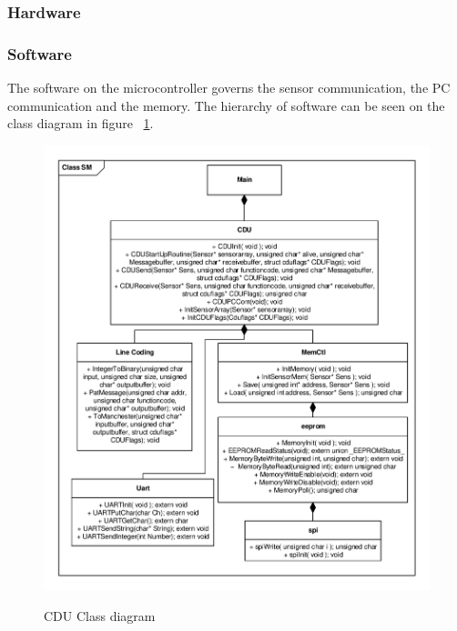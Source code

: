 \subsubsection{Hardware}

\subsubsection{Software}
The software on the microcontroller governs the sensor communication, the PC communication and the memory. The hierarchy of software can be seen on the class diagram in figure ~\ref{fig:cduclassd}.

\begin{figure}[H]
\centering
\includegraphics[scale=0.8]{billeder/CDUClassDiagramme}
\label{fig:cduclassd}
\caption{CDU Class diagram}
\end{figure}

